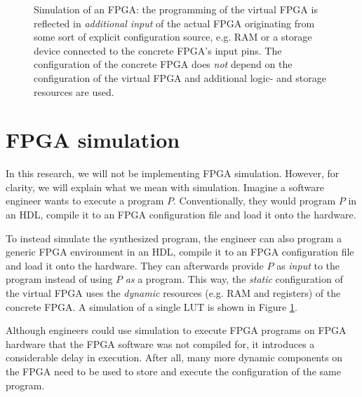 \begin{figure}
    \caption{Simulation of an FPGA: the programming of the virtual FPGA is reflected in \textit{additional input} of the actual FPGA originating from some sort of explicit configuration source, e.g. RAM or a storage device connected to the concrete FPGA's input pins. The configuration of the concrete FPGA does \textit{not} depend on the configuration of the virtual FPGA and additional logic- and storage resources are used.}
    \label{fig:simulation}
\end{figure}

\section{FPGA simulation}
\label{sec:simulation}
In this research, we will not be implementing FPGA simulation. However, for clarity, we will explain what we mean with simulation. Imagine a software engineer wants to execute a program $P$. Conventionally, they would program $P$ in an HDL, compile it to an FPGA configuration file and load it onto the hardware.

To instead simulate the synthesized program, the engineer can also program a generic FPGA environment in an HDL, compile it to an FPGA configuration file and load it onto the hardware. They can afterwards provide $P$ as \textit{input} to the program instead of using $P$ \textit{as} a program. This way, the \textit{static} configuration of the virtual FPGA uses the \textit{dynamic} resources (e.g. RAM and registers) of the concrete FPGA. A simulation of a single LUT is shown in Figure \ref{fig:simulation}.

Although engineers could use simulation to execute FPGA programs on FPGA hardware that the FPGA software was not compiled for, it introduces a considerable delay in execution. After all, many more dynamic components on the FPGA need to be used to store and execute the configuration of the same program.	



